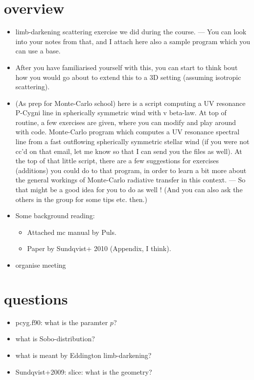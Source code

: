 \documentclass[../main/main.tex]{subfiles}
\begin{document}
\section{overview}

\begin{itemize}
\item limb-darkening scattering exercise we did during the course. 
— You can look into your notes from that, and I attach here also a sample program which you can use a base. 

\item After you have familiarised yourself with this, you can start to think bout how you would go about to extend this to a 3D setting (assuming isotropic scattering). 

\item (As prep for Monte-Carlo school) here is a script computing a UV resonance P-Cygni line in spherically symmetric wind with v beta-law. At top of routine, a few exercises are given, where you can modify and play around with code. Monte-Carlo program which computes a UV resonance spectral line from a fast outflowing spherically symmetric stellar wind (if you were not cc’d on that email, let me know so that I can send you the files as well). At the top of that little script, there are a few suggestions for exercises (additions) you could do to that program, in order to learn a bit more about the general workings of Monte-Carlo radiative transfer in this context.  
— So that might be a good idea for you to do as well !   (And you can also ask the others in the group for some tips etc. then.) 

\item Some background reading: 
\begin{itemize}
\item Attached mc manual by Puls. 
\item Paper by Sundqvist+ 2010 (Appendix, I think). 
\end{itemize}

\item organise meeting

\end{itemize}

\section{questions}
\begin{itemize}
\item pcyg.f90: what is the paramter $p$?
\item what is Sobo-distribution?
\item what is meant by Eddington limb-darkening?
\item Sundqvist+2009: slice: what is the geometry?
\end{itemize}
\end{document}
